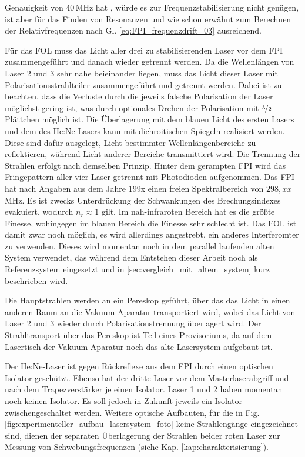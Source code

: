 Genauigkeit von $40\,$MHz hat
\cite{wavemeter_hardware_guide}, würde es zur Frequenzstabilisierung nicht genügen, ist aber für das Finden von Resonanzen und wie schon erwähnt zum Berechnen der Relativfrequenzen nach Gl. \eqref{eq:FPI_frequenzdrift_03}
ausreichend.\par
Für das FOL muss das Licht aller drei zu stabilisierenden
Laser vor dem FPI zusammengeführt und danach wieder getrennt werden. Da die
Wellenlängen von Laser 2 und 3 sehr nahe beieinander liegen, muss das Licht
dieser Laser mit Polarisationsstrahlteiler zusammengeführt und getrennt werden.
Dabei ist zu beachten, dass die Verluste durch die jeweils falsche Polarisation
der Laser möglichst gering ist, was durch optionales Drehen der
Polarisation mit $\nicefrac{\lambda}{2}$-Plättchen möglich ist. Die Überlagerung
mit dem blauen Licht des ersten Lasers und dem des He:Ne-Lasers kann mit
dichroitischen Spiegeln realisiert werden. Diese sind dafür ausgelegt, Licht
bestimmter Wellenlängenbereiche zu reflektieren, während Licht anderer  Bereiche
transmittiert wird. Die Trennung der Strahlen erfolgt nach demselben Prinzip.
Hinter dem gerampten FPI wird das Fringepattern aller vier Laser getrennt mit Photodioden aufgenommen. Das FPI hat nach Angaben aus dem Jahre 199x einen
freien Spektralbereich von $298,xx\,$MHz. Es ist zwecks Unterdrückung der
Schwankungen des Brechungsindexes evakuiert, wodurch $n_r\approx1$ gilt. Im
nah-infraroten Bereich hat es die größte Finesse, wohingegen im blauen Bereich
die Finesse sehr schlecht ist. Das FOL ist damit zwar noch
möglich, es wird allerdings angestrebt, ein anderes Interferomter zu verwenden.
Dieses wird momentan noch in dem parallel laufenden alten System verwendet, das
während dem Entstehen dieser Arbeit noch als Referenzsystem eingesetzt und in
\ref{sec:vergleich_mit_altem_system} kurz beschrieben wird.\par
Die Hauptstrahlen werden an ein Pereskop geführt, über das das Licht in einen
anderen Raum an die Vakuum-Aparatur transportiert wird, wobei das Licht von
Laser 2 und 3 wieder durch Polarisationstrennung überlagert wird. Der
Strahltransport über das Pereskop ist Teil eines Provisoriums, da auf dem
Lasertisch der Vakuum-Aparatur noch das alte Lasersystem aufgebaut ist.\par
Der He:Ne-Laser ist gegen Rückreflexe aus dem FPI durch einen optischen Isolator
geschützt. Ebenso hat der dritte Laser vor dem Masterlaserabgriff und nach dem
Trapezverstärker je einen Isolator. Laser 1 und 2 haben momentan noch keinen
Isolator. Es soll jedoch in Zukunft jeweils ein Isolator zwischengeschaltet
werden. Weitere optische Aufbauten, für die in Fig.
\ref{fig:experimenteller_aufbau_lasersystem_foto} keine Strahlengänge eingezeichnet
sind, dienen der separaten Überlagerung der Strahlen beider roten Laser zur
Messung von Schwebungsfrequenzen (siehe Kap. \ref{kap:charakterisierung}).


